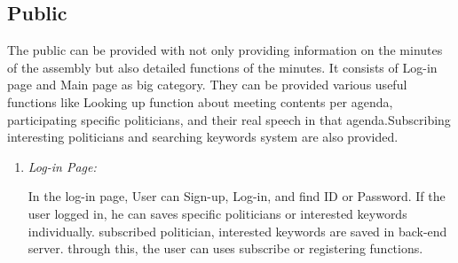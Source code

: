 \documentclass[conference]{IEEEtran}
\begin{document}
\subsection{Public}
The public can be provided with  not only providing information on the minutes of the assembly but also detailed functions of the minutes. It consists of Log-in page and Main page as big category. They can be provided various useful functions like Looking up function about meeting contents per agenda, participating specific politicians, and their real speech in that agenda.Subscribing interesting politicians and searching keywords system are also provided. \\
\begin{enumerate}
    \item \textit {Log-in Page: }
 
   
In the log-in page, User can Sign-up, Log-in, and find ID or Password. If the user logged in, he can saves specific politicians or interested keywords individually. subscribed politician, interested keywords are saved in back-end server. through this, the user can uses subscribe or registering functions.\\
   

\end{enumerate}
\end{document}
